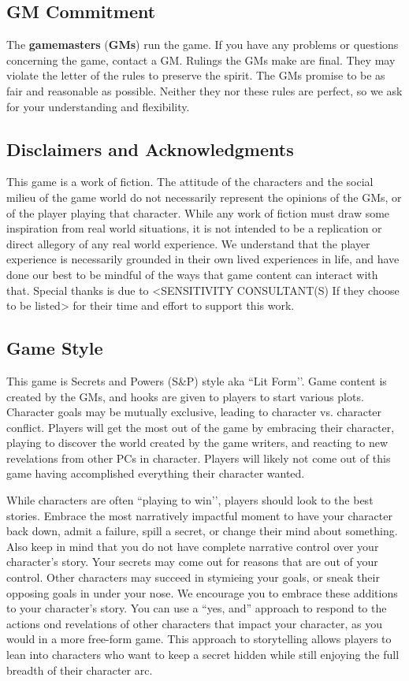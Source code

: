 \documentclass[sheet]{GL2020}
\begin{document}
\subsection{GM Commitment}
The \textbf{gamemasters} (\textbf{GMs}) run the game. If you have any problems or questions concerning the game, contact a GM. Rulings the GMs make are final.  They may violate the letter of the rules to preserve the spirit.  The GMs promise to be as fair and reasonable as possible. Neither they nor these rules are perfect, so we ask for your understanding and flexibility.

\subsection{Disclaimers and Acknowledgments}
This game is a work of fiction. The attitude of the characters and the social milieu of the game world do not necessarily represent the opinions of the GMs, or of the player playing that character. While any work of fiction must draw some inspiration from real world situations, it is not intended to be a replication or direct allegory of any real world experience. We understand that the player experience is necessarily grounded in their own lived experiences in life, and have done our best to be mindful of the ways that game content can interact with that. Special thanks is due to <SENSITIVITY CONSULTANT(S) If they choose to be listed> for their time and effort to support this work. 

\subsection{Game Style}
This game is Secrets and Powers (S\&P) style aka ``Lit Form’’. Game content is created by the GMs, and hooks are given to players to start various plots. Character goals may be mutually exclusive, leading to character vs. character conflict. Players will get the most out of the game by embracing their character, playing to discover the world created by the game writers, and reacting to new revelations from other PCs in character. Players will likely not come out of this game having accomplished everything their character wanted.

While characters are often ``playing to win’’, players should look to the best stories. Embrace the most narratively impactful moment to have your character back down, admit a failure, spill a secret, or change their mind about something. Also keep in mind that you do not have complete narrative control over your character’s story. Your secrets may come out for reasons that are out of your control. Other characters may succeed in stymieing your goals, or sneak their opposing goals in under your nose. We encourage you to embrace these additions to your character’s story. You can use a ``yes, and'' approach to respond to the actions ond revelations of other characters that impact your character, as you would in a more free-form game. This approach to storytelling allows players to lean into characters who want to keep a secret hidden while still enjoying the full breadth of their character arc.
\end{document}
